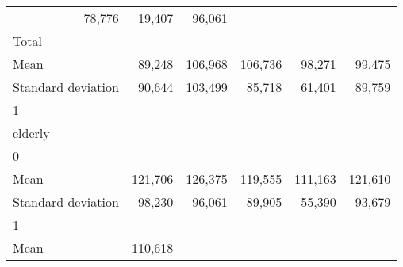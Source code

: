\begin{tabular}{llllll}
  \multicolumn{1}{r}{78,776} &
  \multicolumn{1}{r}{19,407} &
  \multicolumn{1}{r}{96,061} \\
\multicolumn{1}{l}{\hspace{3em}Total} &
  \multicolumn{1}{|r}{} &
  \multicolumn{1}{r}{} &
  \multicolumn{1}{r}{} &
  \multicolumn{1}{r}{} &
  \multicolumn{1}{r}{} \\
\multicolumn{1}{l}{\hspace{4em}Mean} &
  \multicolumn{1}{|r}{89,248} &
  \multicolumn{1}{r}{106,968} &
  \multicolumn{1}{r}{106,736} &
  \multicolumn{1}{r}{98,271} &
  \multicolumn{1}{r}{99,475} \\
\multicolumn{1}{l}{\hspace{4em}Standard deviation} &
  \multicolumn{1}{|r}{90,644} &
  \multicolumn{1}{r}{103,499} &
  \multicolumn{1}{r}{85,718} &
  \multicolumn{1}{r}{61,401} &
  \multicolumn{1}{r}{89,759} \\
\multicolumn{1}{l}{\hspace{1em}1} &
  \multicolumn{1}{|r}{} &
  \multicolumn{1}{r}{} &
  \multicolumn{1}{r}{} &
  \multicolumn{1}{r}{} &
  \multicolumn{1}{r}{} \\
\multicolumn{1}{l}{\hspace{2em}elderly} &
  \multicolumn{1}{|r}{} &
  \multicolumn{1}{r}{} &
  \multicolumn{1}{r}{} &
  \multicolumn{1}{r}{} &
  \multicolumn{1}{r}{} \\
\multicolumn{1}{l}{\hspace{3em}0} &
  \multicolumn{1}{|r}{} &
  \multicolumn{1}{r}{} &
  \multicolumn{1}{r}{} &
  \multicolumn{1}{r}{} &
  \multicolumn{1}{r}{} \\
\multicolumn{1}{l}{\hspace{4em}Mean} &
  \multicolumn{1}{|r}{121,706} &
  \multicolumn{1}{r}{126,375} &
  \multicolumn{1}{r}{119,555} &
  \multicolumn{1}{r}{111,163} &
  \multicolumn{1}{r}{121,610} \\
\multicolumn{1}{l}{\hspace{4em}Standard deviation} &
  \multicolumn{1}{|r}{98,230} &
  \multicolumn{1}{r}{96,061} &
  \multicolumn{1}{r}{89,905} &
  \multicolumn{1}{r}{55,390} &
  \multicolumn{1}{r}{93,679} \\
\multicolumn{1}{l}{\hspace{3em}1} &
  \multicolumn{1}{|r}{} &
  \multicolumn{1}{r}{} &
  \multicolumn{1}{r}{} &
  \multicolumn{1}{r}{} &
  \multicolumn{1}{r}{} \\
\multicolumn{1}{l}{\hspace{4em}Mean} &
  \multicolumn{1}{|r}{110,618} &

\end{tabular}
